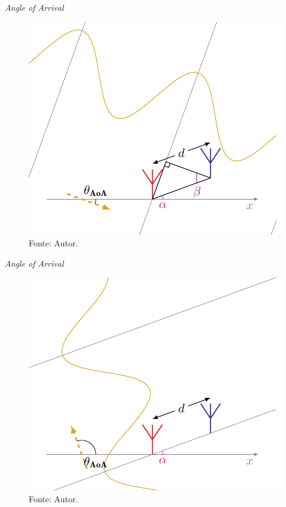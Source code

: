     \begin{frame}{\textit{Angle of Arrival}}
        \begin{figure}
            \centering
            \caption*{$ \theta_\text{AoA} = \SI{-20}{\degree} $, $\textcolor{cmyk_M}{\alpha_{k}}=\SI{20}{\degree}$, $ \textcolor{Purple}{\beta_{\pm k}} = \SI{40}{\degree} $}
            \includegraphics{../pictures/AoA_2}
            \caption*{\tiny Fonte: Autor.}
        \end{figure}
    \end{frame}

    \begin{frame}{\textit{Angle of Arrival}}
        \begin{figure}
            \centering
            \caption*{$ \theta_\text{AoA}=\SI{110}{\degree} $, $\textcolor{cmyk_M}{\alpha_{k}}=\SI{20}{\degree}$, $ \textcolor{Purple}{\beta_{\pm k}} = \SI{90}{\degree} $}
            \includegraphics{../pictures/AoA_3}
            \caption*{\tiny Fonte: Autor.}
        \end{figure}
    \end{frame}

